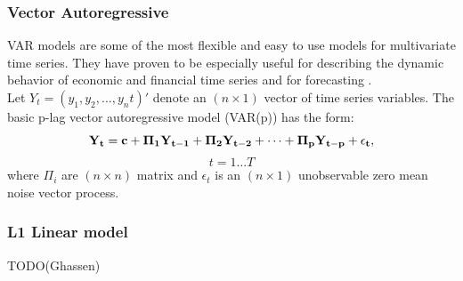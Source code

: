 \subsubsection{Vector Autoregressive}
VAR models are some of the most flexible and easy to use models for multivariate time series. They have proven to be especially useful for describing the dynamic behavior of economic and financial time series and for forecasting \cite{tsay, VAR}. \\
Let $Y_t = (y_1, y_2,...,y_nt)'$ denote an $(n \times 1)$ vector of time series variables. The basic p-lag vector autoregressive model (VAR(p)) has the form:
$$\bf{Y}_t=\bf{c}+\bf{\Pi}_1\bf{Y}_{t-1}+\bf{\Pi}_2\bf{Y}_{t-2}+\cdots+\bf{\Pi}_p\bf{Y}_{t-p}+\epsilon_t,$$ $$t=1\ldots T$$
where $\Pi_i$ are $(n \times n)$ matrix and $\epsilon_t$ is an $(n \times 1)$ unobservable zero mean noise vector process.

\subsubsection{L1 Linear model}

TODO(Ghassen)

